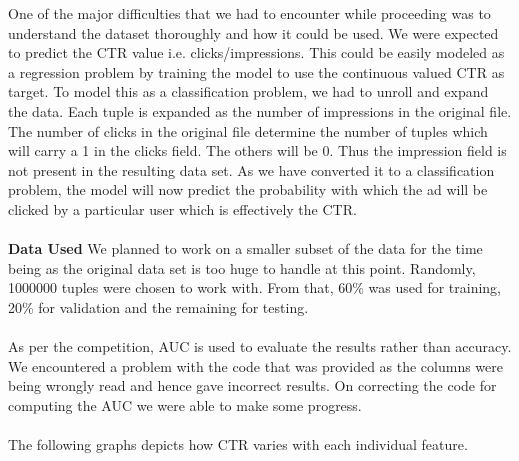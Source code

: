 \documentclass[10pt]{article}
\begin{document}
One of the major difficulties that we had to encounter while proceeding was to understand the dataset thoroughly and how it could be used. We were expected to predict the CTR value i.e. clicks/impressions. This could be easily modeled as a regression problem by training the model to use the continuous valued CTR as target. To model this as a classification problem, we had to unroll and expand the data. Each tuple is expanded as the number of impressions in the original file. The number of clicks in the original file determine the number of tuples which will carry a 1 in the clicks field. The others will be 0. Thus the impression field is not present in the resulting data set. As we have converted it to a classification problem, the model will now predict the probability with which the ad will be clicked by a particular user which is effectively the CTR. \\\\

\textbf{Data Used} We planned to work on a smaller subset of the data for the time being as the original data set is too huge to handle at this point. Randomly, 1000000 tuples were chosen to work with. From that, 60\% was used for training, 20\% for validation and the remaining for testing.\\\\

As per the competition, AUC is used to evaluate the results rather than accuracy. We encountered a problem with the code that was provided as the columns were being wrongly read and hence gave incorrect results. On correcting the code for computing the AUC we were able to make some progress. \\\\

The following graphs depicts how CTR varies with each individual feature.\\
\end{document}
